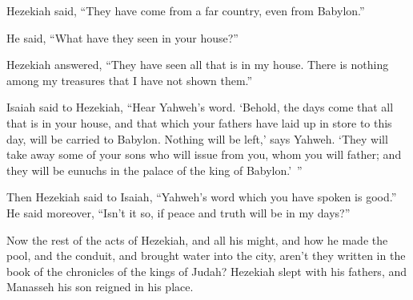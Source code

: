 {\par }{\PP Hezekiah said, “They have come from a far country, even from Babylon.”
\par }{\PP {}He said, “What have they seen in your house?”
\par }{\PP Hezekiah answered, “They have seen all that is in my house. There is nothing among my treasures that I have not shown them.”
\par }{\PP {}Isaiah said to Hezekiah, “Hear Yahweh’s word.
‘Behold, the days come that all that is in your house, and that which your fathers have laid up in store to this day, will be carried to Babylon. Nothing will be left,’ says Yahweh.
‘They will take away some of your sons who will issue from you, whom you will father; and they will be eunuchs in the palace of the king of Babylon.’ ”
\par }{\PP {}Then Hezekiah said to Isaiah, “Yahweh’s word which you have spoken is good.” He said moreover, “Isn’t it so, if peace and truth will be in my days?”
\par }{\PP {}Now the rest of the acts of Hezekiah, and all his might, and how he made the pool, and the conduit, and brought water into the city, aren’t they written in the book of the chronicles of the kings of Judah?
Hezekiah slept with his fathers, and Manasseh his son reigned in his place.

}
